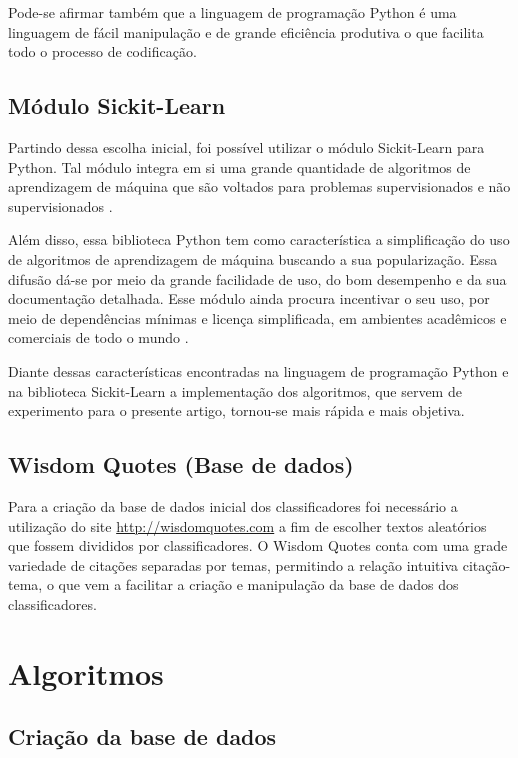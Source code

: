 \documentclass[preprint,12pt,times]{elsarticle}
\begin{document}
	Pode-se afirmar também que a linguagem de programação Python é uma linguagem de fácil manipulação e de grande eficiência produtiva o que facilita todo o processo de codificação.
	
	\subsection{Módulo Sickit-Learn}
	Partindo dessa escolha inicial, foi possível utilizar o módulo Sickit-Learn para Python. Tal módulo integra em si uma grande quantidade de algoritmos de aprendizagem de máquina que são voltados para problemas supervisionados e não supervisionados \cite{scikit-learn}. 
	
	Além disso, essa biblioteca Python tem como característica a simplificação do uso de algoritmos de aprendizagem de máquina buscando a sua popularização. Essa difusão dá-se por meio da grande facilidade de uso, do bom desempenho e da sua documentação detalhada. Esse módulo ainda procura incentivar o seu uso, por meio de dependências mínimas e licença simplificada, em ambientes acadêmicos e comerciais de todo o mundo \cite{scikit-learn}.
	
	Diante dessas características encontradas na linguagem de programação Python e na biblioteca Sickit-Learn a implementação dos algoritmos, que servem de experimento para o presente artigo, tornou-se mais rápida e mais objetiva.
	
	\subsection{Wisdom Quotes (Base de dados)}
	Para a criação da base de dados inicial dos classificadores foi necessário a utilização do site \url{http://wisdomquotes.com} a fim de escolher textos aleatórios que fossem divididos por classificadores. O Wisdom Quotes conta com uma grade variedade de citações separadas por temas, permitindo a relação intuitiva citação-tema, o que vem a facilitar a criação e manipulação da base de dados dos classificadores.
	
	\section{Algoritmos}
	\label{Algoritmos}
	
	\subsection{Criação da base de dados}
	
\end{document}
